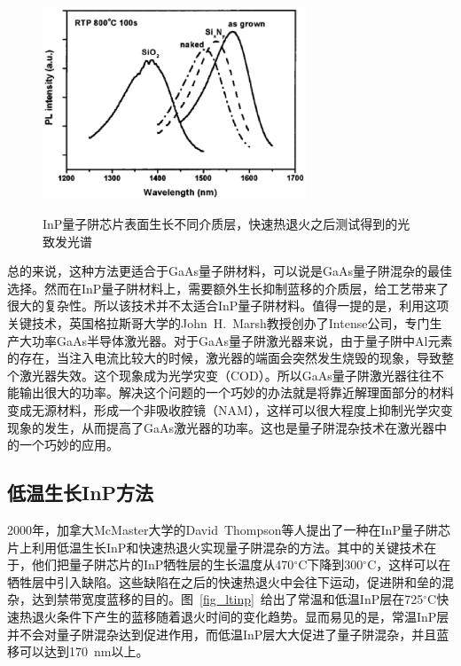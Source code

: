 \documentclass{ZJUthesis}
\begin{document}
\begin{figure}[htbp]
  \centering
  \includegraphics[width=0.7\textwidth]{./Pictures/ifvd2.eps}\\
  \caption{InP量子阱芯片表面生长不同介质层，快速热退火之后测试得到的光致发光谱}
  \label{fig_ifvd2}
\end{figure}

总的来说，这种方法更适合于GaAs量子阱材料，可以说是GaAs量子阱混杂的最佳选择。然而在InP量子阱材料上，需要额外生长抑制蓝移的介质层，给工艺带来了很大的复杂性。所以该技术并不太适合InP量子阱材料。值得一提的是，利用这项关键技术，英国格拉斯哥大学的John~H.~Marsh教授创办了Intense公司，专门生产大功率GaAs半导体激光器。对于GaAs量子阱激光器来说，由于量子阱中Al元素的存在，当注入电流比较大的时候，激光器的端面会突然发生烧毁的现象，导致整个激光器失效。这个现象成为光学灾变（COD）\cite{Sanayeh2006Investigation}。所以GaAs量子阱激光器往往不能输出很大的功率。解决这个问题的一个巧妙的办法就是将靠近解理面部分的材料变成无源材料，形成一个非吸收腔镜（NAM），这样可以很大程度上抑制光学灾变现象的发生，从而提高了GaAs激光器的功率。这也是量子阱混杂技术在激光器中的一个巧妙的应用。

\subsection{低温生长InP方法}

2000年，加拿大McMaster大学的David~Thompson等人提出了一种在InP量子阱芯片上利用低温生长InP和快速热退火实现量子阱混杂的方法\cite{Author2000New}\cite{Lee2000Enhanced}。其中的关键技术在于，他们把量子阱芯片的InP牺牲层的生长温度从470$^{\circ}$C下降到300$^{\circ}$C，这样可以在牺牲层中引入缺陷。这些缺陷在之后的快速热退火中会往下运动，促进阱和垒的混杂，达到禁带宽度蓝移的目的。图~\ref{fig_ltinp}~给出了常温和低温InP层在725$^{\circ}$C快速热退火条件下产生的蓝移随着退火时间的变化趋势。显而易见的是，常温InP层并不会对量子阱混杂达到促进作用，而低温InP层大大促进了量子阱混杂，并且蓝移可以达到170~nm以上。
\end{document}

